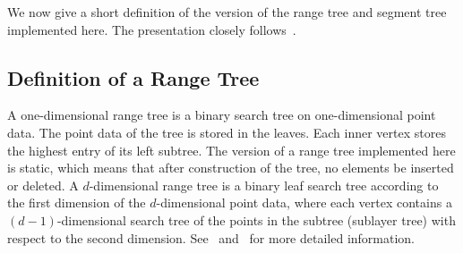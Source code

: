 We now give a short definition of the version of
the range tree and segment tree implemented here. The
presentation closely follows~\cite{bkos-cgaa-97}.

\subsection{Definition of a Range Tree}

A one-dimensional range tree is a binary search tree on one-dimensional 
point data. 
The point data of the tree is stored in the leaves. 
Each inner vertex stores the highest entry of its left subtree.
The version of a range tree implemented here is static, which means that 
after construction of the tree, no elements be inserted or deleted.
A $d$-dimensional range tree is a binary leaf search tree according to the 
first dimension of the $d$-dimensional point data, where each vertex contains 
a $(d-1)$-dimensional search tree of the points in the subtree (sublayer tree)
with respect to the second dimension.
See~\cite{bkos-cgaa-97} and~\cite{Samet90} for more detailed information.

